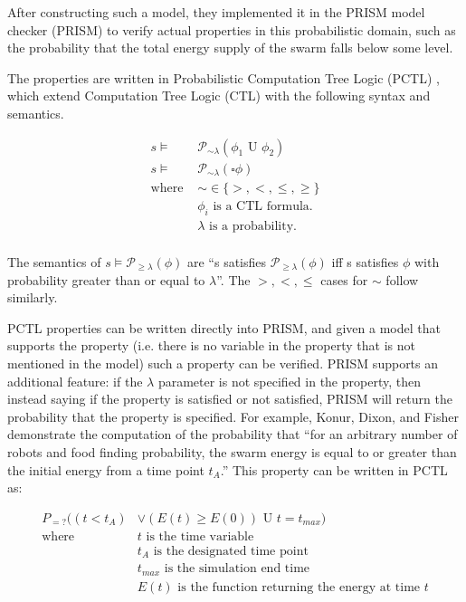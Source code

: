\documentclass[11pt]{article}
\theoremstyle{definition}
\begin{document}
After constructing such a model, they implemented it in the PRISM model checker
(PRISM) to verify actual properties in this probabilistic domain, such
as the probability that the total energy supply of the swarm
falls below some level.

The properties are written in Probabilistic Computation Tree
Logic (PCTL) \cite{pctl}, which extend Computation Tree Logic (CTL)
with the following syntax and semantics.

\begin{align*}
    s \vDash & \mathcal{P}_{\sim\lambda}(\phi_1 \text{ U } \phi_2) \\
    s \vDash & \mathcal{P}_{\sim\lambda}(\square \phi) \\
    \text{where } & \sim \in \{ >, <, \leq, \geq \} \\
                  & \phi_i \text{ is a CTL formula.} \\
                  & \lambda \text{ is a probability.} \\
\end{align*}

The semantics of $ s \vDash \mathcal{P}_{\geq\lambda} ( \phi ) $ are
``s satisfies $ \mathcal{P}_{\geq\lambda} ( \phi ) $ iff s
satisfies $ \phi $ with probability greater than or equal
to $ \lambda $''.
The $ >, <, \leq $ cases for $ \sim $ follow similarly.

PCTL properties can be written directly into PRISM, and
given a model that supports the property (i.e. there is
no variable in the property that is not mentioned
in the model) such a property can be verified.
PRISM supports an additional feature: if the $ \lambda $
parameter is not specified in the property, then
instead saying if the property is satisfied or not
satisfied, PRISM will return the probability that
the property is specified. For example, Konur,
Dixon, and Fisher demonstrate the computation of
the probability that ``for an arbitrary number of robots
and food finding probability, the swarm energy is
equal to or greater than the initial energy from
a time point $ t_A $.'' This property can be written
in PCTL as:

\begin{align*}
    P_{=?}((t < t_A) & \vee (E(t) \geq E(0)) \text{ U } t = t_{max} ) \\
    \text{where } & t \text{ is the time variable} \\
                  & t_A \text{ is the designated time point} \\
                  & t_{max} \text{ is the simulation end time} \\
                  & E(t) \text{ is the function returning the energy at time } t
\end{align*}
\end{document}
